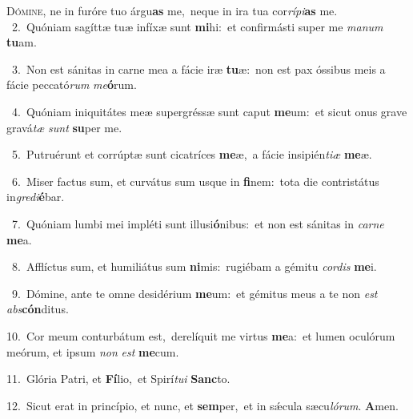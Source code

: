 \lettrine{\initial\textcolor{\initialcolor}{D}}{ómine,} ne in furóre tuo árgu\textbf{as} me,~\star neque in ira tua cor\-\textit{rí}\-\textit{pi}\textbf{as} me.\\
{\numbfont\textcolor{\numbcolor}{~2.}}~Quóniam sagíttæ tuæ infíxæ sunt \textbf{mi}\-hi:~\star et confirmásti super me \textit{ma}\-\textit{num} \textbf{tu}\-am.\par
{\numbfont\textcolor{\numbcolor}{~3.}}~Non est sánitas in carne mea a fácie iræ \textbf{tu}\-æ:~\star non est pax óssibus meis a fácie peccató\textit{rum} \textit{me}\-\textbf{ó}rum.\par
{\numbfont\textcolor{\numbcolor}{~4.}}~Quóniam iniquitátes meæ supergréssæ sunt caput \textbf{me}\-um:~\star et sicut onus grave gravá\textit{tæ} \textit{sunt} \textbf{su}\-per me.\par
{\numbfont\textcolor{\numbcolor}{~5.}}~Putruérunt et corrúptæ sunt cicatríces \textbf{me}\-æ,~\star a fácie insipién\-\textit{ti}\-\textit{æ} \textbf{me}\-æ.\par
{\numbfont\textcolor{\numbcolor}{~6.}}~Miser factus sum, et curvátus sum usque in \textbf{fi}\-nem:~\star tota die contristátus in\-\textit{gre}\-\textit{di}\textbf{é}bar.\par
{\numbfont\textcolor{\numbcolor}{~7.}}~Quóniam lumbi mei impléti sunt illusi\-\textbf{ó}\-nibus:~\star et non est sánitas in \textit{car}\-\textit{ne} \textbf{me}\-a.\par
{\numbfont\textcolor{\numbcolor}{~8.}}~Afflíctus sum, et humiliátus sum \textbf{ni}\-mis:~\star rugiébam a gémitu \textit{cor}\-\textit{dis} \textbf{me}\-i.\par
{\numbfont\textcolor{\numbcolor}{~9.}}~Dómine, ante te omne desidérium \textbf{me}\-um:~\star et gémitus meus a te non \textit{est} \textit{abs}\-\textbf{cón}ditus.\par
{\numbfont\textcolor{\numbcolor}{10.}}~Cor meum conturbátum est,~\dagger derelíquit me virtus \textbf{me}\-a:~\star et lumen oculórum meórum, et ipsum \textit{non} \textit{est} \textbf{me}\-cum.\par
{\numbfont\textcolor{\numbcolor}{11.}}~Glória Patri, et \textbf{Fí}\-lio,~\star et Spirí\-\textit{tu}\-\textit{i} \textbf{Sanc}\-to.\par
{\numbfont\textcolor{\numbcolor}{12.}}~Sicut erat in princípio, et nunc, et \textbf{sem}\-per,~\star et in sǽcula sæcu\-\textit{ló}\-\textit{rum}. \textbf{A}\-men.\par
